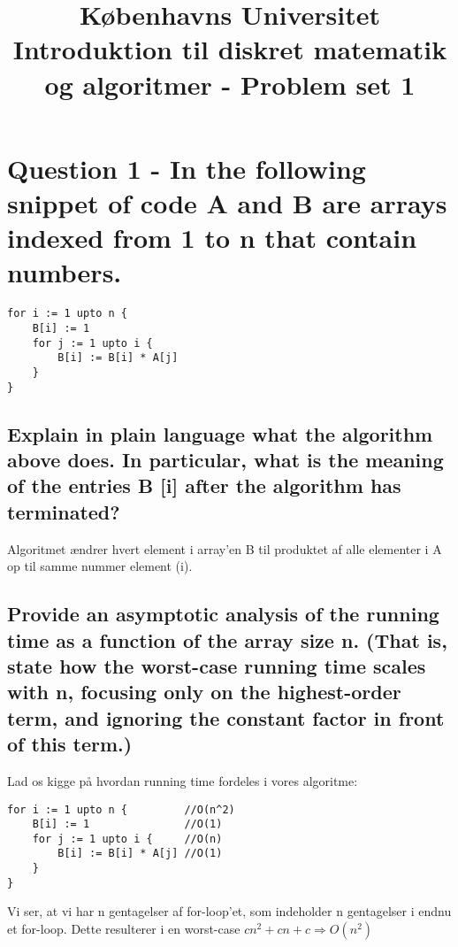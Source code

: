 \documentclass[a4paper,12pt]{article}
\begin{document}
% 

\title{Københavns Universitet\\
Introduktion til diskret matematik og algoritmer - Problem set 1}
\maketitle %

\section[Question 1]{Question 1 - In the following snippet of code A and B are arrays indexed from 1 to n that contain numbers. }

\begin{lstlisting}
for i := 1 upto n { 
    B[i] := 1 
    for j := 1 upto i {
        B[i] := B[i] * A[j] 
    }
} 
\end{lstlisting}

\subsection[]{Explain in plain language what the algorithm above does. In particular, what is the meaning of the entries B [i] after the algorithm has terminated? }

Algoritmet ændrer hvert element i array'en B til produktet af alle elementer i A op til samme nummer element (i).

\subsection[]{Provide an asymptotic analysis of the running time as a function of the array size n. (That is, state how the worst-case running time scales with n, focusing only on the highest-order term, and ignoring the constant factor in front of this term.)}

Lad os kigge på hvordan running time fordeles i vores algoritme:
\begin{lstlisting}
for i := 1 upto n {         //O(n^2)
    B[i] := 1               //O(1)
    for j := 1 upto i {     //O(n)
        B[i] := B[i] * A[j] //O(1)
    }
}
\end{lstlisting}
Vi ser, at vi har n gentagelser af for-loop'et, som indeholder n gentagelser i endnu et for-loop. Dette resulterer i en worst-case $cn^2 + cn + c \Rightarrow O(n^2)$
\end{document}
